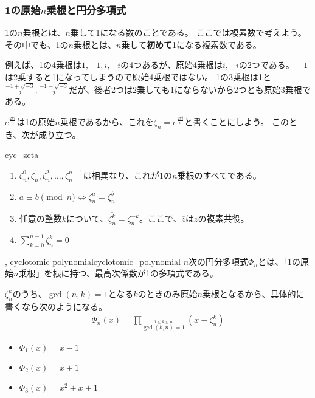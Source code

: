 \subsubsection{1の原始$n$乗根と円分多項式}
1の$n$乗根とは、$n$乗して1になる数のことである。
ここでは複素数で考えよう。
その中でも、1の$n$乗根とは、$n$乗して\textbf{初めて}1になる複素数である。

例えば、1の4乗根は$1,-1,i,-i$の4つあるが、原始4乗根は$i,-i$の2つである。
$-1$は2乗すると1になってしまうので原始4乗根ではない。
1の3乗根は1と$\frac{-1+\sqrt{-3}}{2},\frac{-1-\sqrt{-3}}{2}$だが、後者2つは2乗しても1にならないから2つとも原始3乗根である。

$e^{\frac{2\pi i}{n}}$は1の原始$n$乗根であるから、これを$\zeta_n=e^{\frac{2\pi i}{n}}$と書くことにしよう。
このとき、次が成り立つ。

\begin{Prop}{}{cyc_zeta}\;
\begin{enumerate}
 \item $\zeta_n^0,\zeta_n^1,\zeta_n^2,\ldots,\zeta_n^{n-1}$は相異なり、これが1の$n$乗根のすべてである。
 \item $a\equiv b \pmod{n} \iff \zeta_n^a = \zeta_n^b$
 \item 任意の整数$k$について、$\overline{\zeta_n^k} = \zeta_n^{-k}$。ここで、$\overline{z}$は$z$の複素共役。
 \item $\sum_{k=0}^{n-1} \zeta_n^k = 0$
\end{enumerate}
\end{Prop}

\begin{Defi}{, cyclotomic polynomial}{cyclotomic_polynomial}
$n$次の円分多項式$\Phi_n$とは、「1の原始$n$乗根」を根に持つ、最高次係数が1の多項式である。
\end{Defi}

$\zeta_n^k$のうち、$\gcd(n,k)=1$となる$k$のときのみ原始$n$乗根となるから、具体的に書くなら次のようになる。
\begin{align*}
\Phi_n(x)=\prod_{\stackrel{1 \le k \le n}{\gcd(k,n)=1}}(x - \zeta_n^k)
\end{align*}

\begin{Exam}{}{}\;
\begin{itemize}
 \item $\Phi_1(x) = x-1$
 \item $\Phi_2(x) = x+1$
 \item $\Phi_3(x) = x^2+x+1$
\end{itemize}
\end{Exam}

